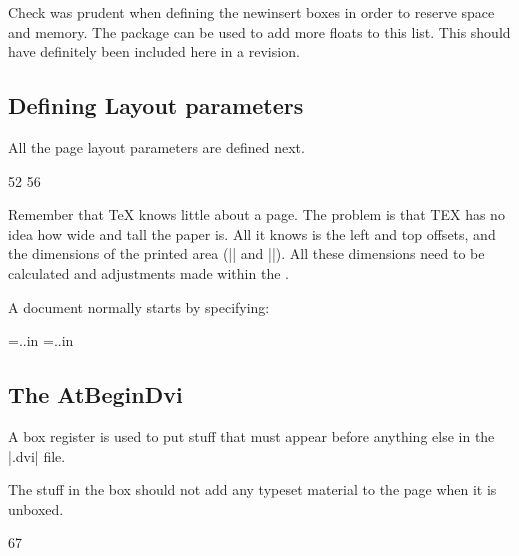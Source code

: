 \begin{multicols}{2}
Check was prudent when defining the newinsert boxes in order to reserve space and memory. The package  can be used to add more floats to this list. This should have definitely been included here in a revision.

\subsection{Defining Layout parameters} All the page layout parameters are defined next. 

\begin{teXXX}
52 \newdimen{} \newdimen{} \newdimen{} \let\@themargin=\oddsidemargin
56 \newdimen{} \newdimen{} \newdimen{} \newdimen{} \newdimen{} \newdimen{} \newdimen{} \newdimen{} \newdimen{} \newdimen{} \newdimen\marginparpush
\end{teXXX}

Remember  that TeX knows little about a page. The problem is that TEX has no idea how
wide and tall the paper is. All it knows is the
left and top offsets, and the dimensions of the
printed area (|\hsize| and |\vsize|). All these dimensions need to be calculated and adjustments made within the \otr.

A document normally  starts by specifying:

\begin{teXXX}
\newdimen\paperheight
\newdimen\paperwidth
\paperheight=..in \paperwidth=..in
\end{teXXX}


\end{multicols}


\subsection*{The AtBeginDvi}
A box register is used  to put stuff that must appear before anything else
in the |.dvi| file.

The stuff in the box should not add any typeset material to the page when it
is unboxed.


\begin{teXXX}
67 \newbox{} \def \AtBeginDvi #1{%
69 \global \setbox \@begindvibox
70 \vbox{\unvbox \@begindvibox #1}%
71 }
\end{teXXX}

